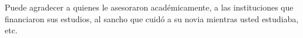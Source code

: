 
\begin{agradecimientos}
Puede agradecer a quienes le asesoraron académicamente,
a las instituciones que financiaron sus estudios, al sancho que
cuidó a su novia mientras usted estudiaba, etc.
\par\lipsum[4]
\end{agradecimientos}
